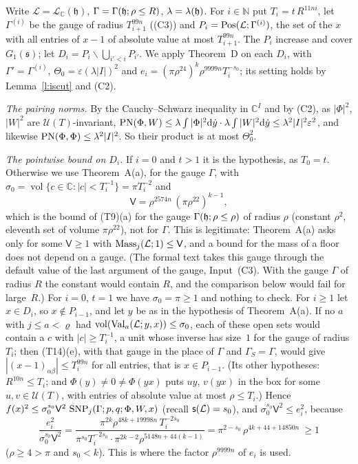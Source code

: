 \documentclass[11pt,a4paper]{article}
\makeatletter
\newcommand{\m}[1]{\mbox{$#1$}}        %
\theoremstyle{plainx}
\theoremstyle{uprightx}
\renewenvironment{proof}[1][Proof]{\par\pushQED{\qed}\normalfont\topsep0pt\partopsep0pt
  \trivlist\item[\hskip\labelsep\itshape #1.]\ignorespaces}{\popQED\endtrivlist\@endpefalse}
\newcommand{\cL}{\mathcal{L}}
\newcommand{\CC}{\mathbb{C}}
\newcommand{\NN}{\mathbb{N}}
\newcommand{\dd}{\mathrm{d}}
\newcommand{\UT}[1]{\mathcal{U}(#1)}
\newcommand{\vol}{\operatorname{vol}}
\newcommand{\cLC}[1]{\mathcal{L}_{\CC}(#1)}
\newcommand{\Gone}[1]{G_1(#1)}
\newcommand{\Inp}[1]{\textup{(#1)}}
\makeatother
\begin{document}
\begin{proof}
Write $\cL=\cLC{\mathfrak{h}}$, $\Gamma=\Gamma(\mathfrak{h};\rho\le R)$, $\lambda=\lambda(\mathfrak{h})$. For
$i\in\NN$ put $T_i=t\,R^{11ni}$, let $\Gamma^{(i)}$ be the gauge of radius $T_{i+1}^{99n}$ (\Inp{C3}) and
$P_i=\positionsOfSize{\cL}{\Gamma^{(i)}}$, the set of the $x$ with all entries of $x-1$ of absolute value at most
$T_{i+1}^{99n}$. The $P_i$ increase and cover $\Gone{\mathfrak{s}}$; let $D_i=P_i\smallsetminus\bigcup_{i'<i}P_{i'}$.
We apply Theorem~D on each $D_i$, with $\Gamma'=\Gamma^{(i)}$, $\Theta_0=\varepsilon(\lambda|I|)^2$ and
$e_i=(\pi\rho^{24})^{k}\rho^{9999n}T_i^{-s_0}$; its setting holds by Lemma~\ref{l:iscut} and \Inp{C2}.

\emph{The pairing norms.} By the Cauchy--Schwarz inequality in $\CC^I$ and by \Inp{C2}, as $|\Phi|^2$, $|W|^2$ are
$\UT{T}$-invariant, $\pairingNorm{\Phi}{W}\le\lambda\int|\Phi|^2\dd\dot y\cdot\lambda\int|W|^2\dd\dot y\le\lambda^2|I|^2\varepsilon^2$,
and likewise $\operatorname{PN}(\Phi,\Phi)\le\lambda^2|I|^2$. So their product is at most $\Theta_0^2$.

\emph{The pointwise bound on $D_i$.} If $i=0$ and $t>1$ it is the hypothesis, as $T_0=t$. Otherwise we use
Theorem~A(a), for the gauge $\Gamma$, with $\sigma_0=\vol\{c\in\CC:|c|<T_i^{-1}\}=\pi T_i^{-2}$ and
\[\mathsf{V}=\rho^{2574n}\,(\pi\rho^{22})^{k-1},\]
which is the bound of \Inp{T9}(a) for the gauge $\Gamma(\mathfrak{h};\rho\le\rho)$ of radius $\rho$ (constant
$\rho^{2}$, eleventh set of volume $\pi\rho^{22}$), not for $\Gamma$. This is legitimate: Theorem~A(a) asks only for
some $\mathsf{V}\ge1$ with \m{\FloorMassLe{\cL}{j}{\mathsf{V}}{1}}, and a bound for the mass of a floor does not depend
on a gauge. (The formal text takes this gauge through the default value of the last argument of the gauge,
Input~\Inp{C3}. With the gauge $\Gamma$ of radius $R$ the constant would contain $R$, and the comparison below would
fail for large~$R$.) For $i=0$, $t=1$ we have $\sigma_0=\pi\ge1$ and nothing to check. For $i\ge1$ let $x\in D_i$, so
$x\notin P_{i-1}$, and let $y$ be as in the hypothesis of Theorem~A(a). If no $a$ with $j\le a<\varrho$ had
$\vol(\floorValues{\cL}{a}{y}{x})\le\sigma_0$, each of these open sets would contain a $c$ with $|c|\ge T_i^{-1}$, a
unit whose inverse has size~$1$ for the gauge of radius $T_i$; then \Inp{T14}(e), with that gauge in the place of
$\Gamma$ and $\Gamma_S=\Gamma$, would give $|(x-1)_{\alpha\beta}|\le T_i^{99n}$ for all entries, that is $x\in P_{i-1}$.
(Its other hypotheses: $R^{10n}\le T_i$; and $\Phi(y)\ne0\ne\Phi(yx)$ puts $uy$, $v(yx)$ in the box for some
$u,v\in\UT{T}$, with entries of absolute value at most $\rho\le T_i$.) Hence
$f(x)^2\le\sigma_0^{s_0}\mathsf{V}^2\,\operatorname{SNP}_{j}(\Gamma;p,q;\Phi,W,x)$ (recall
$\volumeExponent{\cL}=s_0$), and $\sigma_0^{s_0}\mathsf{V}^2\le e_i^2$, because
\[\frac{e_i^{2}}{\sigma_0^{s_0}\mathsf{V}^{2}}
=\frac{\pi^{2k}\rho^{48k+19998n}\,T_i^{-2s_0}}{\pi^{s_0}T_i^{-2s_0}\cdot\pi^{2k-2}\rho^{5148n+44(k-1)}}
=\pi^{2-s_0}\,\rho^{4k+44+14850n}\ \ge1\]
($\rho\ge4>\pi$ and $s_0<k$). This is where the factor $\rho^{9999n}$ of $e_i$ is used.


\end{proof}
\end{document}
